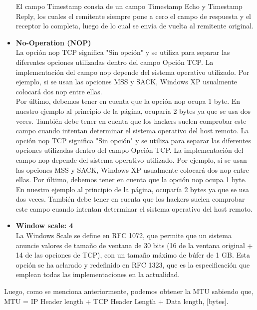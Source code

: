 \documentclass[osajnl,twocolumn,showpacs,superscriptaddress,10pt]{revtex4-1} %
\begin{document}
\begin{itemize}
    El campo Timestamp consta de un campo Timestamp Echo y Timestamp Reply, los cuales el remitente siempre pone a cero el campo de 
    respuesta y el receptor lo completa, luego de lo cual se envía de vuelta al remitente original. \\

    \item \textbf{No-Operation (NOP)} \\

    La opción nop TCP significa "Sin opción" y se utiliza para separar las diferentes opciones utilizadas dentro del campo Opción TCP. 
    La implementación del campo nop depende del sistema operativo utilizado. Por ejemplo, si se usan las opciones MSS y SACK, 
    Windows XP usualmente colocará dos nop entre ellas. \\
    
    Por último, debemos tener en cuenta que la opción nop ocupa 1 byte. En nuestro ejemplo al principio de la página, ocuparía 
    2 bytes ya que se usa dos veces. También debe tener en cuenta que los hackers suelen comprobar este campo cuando intentan 
    determinar el sistema operativo del host remoto. La opción nop TCP significa "Sin opción" y se utiliza para separar las 
    diferentes opciones utilizadas dentro del campo Opción TCP. La implementación del campo nop depende del sistema operativo utilizado. 
    Por ejemplo, si se usan las opciones MSS y SACK, Windows XP usualmente colocará dos nop entre ellas. Por último, debemos tener en 
    cuenta que la opción nop ocupa 1 byte. En nuestro ejemplo al principio de la página, ocuparía 2 bytes ya que se usa dos veces. También 
    debe tener en cuenta que los hackers suelen comprobar este campo cuando intentan determinar el sistema operativo del host remoto. \\

    \item \textbf{Window scale: 4} \\

    La Windows Scale se define en RFC 1072, que permite que un sistema anuncie valores de tamaño de ventana de 30 bits 
    (16 de la ventana original + 14 de las opciones de TCP), con un tamaño máximo de búfer de 1 GB. Esta opción se ha aclarado 
    y redefinido en RFC 1323, que es la especificación que emplean todas las implementaciones en la actualidad.
\end{itemize}

Luego, como se menciona anteriormente, podemos obtener la MTU sabiendo que,
MTU = IP Header length + TCP Header Length + Data length, [bytes]. \\
\end{document}
